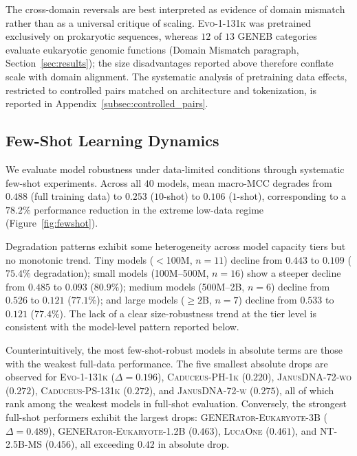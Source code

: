 \documentclass{llmxive}
\begin{document}
The cross-domain reversals are best interpreted as evidence of
domain mismatch rather than as a universal critique of scaling.
\textsc{Evo-1-131k} was pretrained exclusively on prokaryotic
sequences, whereas $12$ of $13$ GENEB categories evaluate eukaryotic
genomic functions (Domain Mismatch paragraph,
Section~\ref{sec:results}); the size disadvantages reported above
therefore conflate scale with domain alignment. The systematic
analysis of pretraining data effects, restricted to controlled pairs
matched on architecture and tokenization, is reported in
Appendix~\ref{subsec:controlled_pairs}.

\subsection{Few-Shot Learning Dynamics}
\label{subsec:fewshot}

We evaluate model robustness under data-limited conditions through
systematic few-shot experiments. Across all $40$ models, mean
macro-MCC degrades from $0.488$ (full training data) to $0.253$
($10$-shot) to $0.106$ ($1$-shot), corresponding to a $78.2\%$
performance reduction in the extreme low-data regime
(Figure~\ref{fig:fewshot}).

Degradation patterns exhibit some heterogeneity across model capacity
tiers but no monotonic trend. Tiny models ($<$100M, $n=11$) decline
from $0.443$ to $0.109$ ($75.4\%$ degradation); small models
(100M--500M, $n=16$) show a steeper decline from $0.485$ to $0.093$
($80.9\%$); medium models (500M--2B, $n=6$) decline from $0.526$ to
$0.121$ ($77.1\%$); and large models ($\geq 2$B, $n=7$) decline from
$0.533$ to $0.121$ ($77.4\%$). The lack of a clear size-robustness
trend at the tier level is consistent with the model-level pattern
reported below.

Counterintuitively, the most few-shot-robust models in absolute terms
are those with the weakest full-data performance. The five smallest
absolute drops are observed for \textsc{Evo-1-131k}
($\Delta = 0.196$), \textsc{Caduceus-PH-1k} ($0.220$),
\textsc{JanusDNA-72-wo} ($0.272$), \textsc{Caduceus-PS-131k}
($0.272$), and \textsc{JanusDNA-72-w} ($0.275$), all of which rank
among the weakest models in full-shot evaluation. Conversely, the
strongest full-shot performers exhibit the largest drops:
\textsc{GENERator-Eukaryote-3B} ($\Delta = 0.489$),
\textsc{GENERator-Eukaryote-1.2B} ($0.463$), \textsc{LucaOne}
($0.461$), and \textsc{NT-2.5B-MS} ($0.456$), all exceeding $0.42$
in absolute drop.
\end{document}
